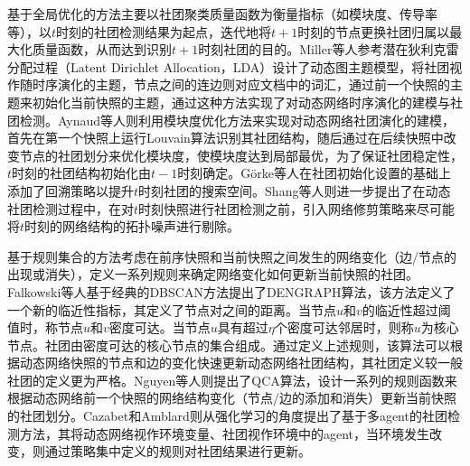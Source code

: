 基于全局优化的方法主要以社团聚类质量函数为衡量指标（如模块度、传导率等），以$t$时刻的社团检测结果为起点，迭代地将$t+1$时刻的节点更换社团归属以最大化质量函数，从而达到识别$t+1$时刻社团的目的。Miller等人\cite{miller2010continuous}参考潜在狄利克雷分配过程（Latent Dirichlet Allocation，LDA）设计了动态图主题模型，将社团视作随时序演化的主题，节点之间的连边则对应文档中的词汇，通过前一个快照的主题来初始化当前快照的主题，通过这种方法实现了对动态网络时序演化的建模与社团检测。Aynaud等人则利用模块度优化方法来实现对动态网络社团演化的建模，首先在第一个快照上运行Louvain算法识别其社团结构，随后通过在后续快照中改变节点的社团划分来优化模块度，使模块度达到局部最优，为了保证社团稳定性，$t$时刻的社团结构初始化由$t-1$时刻确定。G{\"o}rke等人\cite{gorke2010modularity}在社团初始化设置的基础上添加了回溯策略以提升$t$时刻社团的搜索空间。Shang等人\cite{shang2014real}则进一步提出了在动态社团检测过程中，在对$t$时刻快照进行社团检测之前，引入网络修剪策略来尽可能将$t$时刻的网络结构的拓扑噪声进行剔除。  

基于规则集合的方法考虑在前序快照和当前快照之间发生的网络变化（边/节点的出现或消失），定义一系列规则来确定网络变化如何更新当前快照的社团。Falkowski等人\cite{falkowski2008studying}基于经典的DBSCAN\cite{10486339}方法提出了DENGRAPH算法，该方法定义了一个新的临近性指标，其定义了节点对之间的距离。当节点$u$和$v$的临近性超过阈值时，称节点$u$和$v$密度可达。当节点$u$具有超过$\eta$个密度可达邻居时，则称$u$为核心节点。社团由密度可达的核心节点的集合组成。通过定义上述规则，该算法可以根据动态网络快照的节点和边的变化快速更新动态网络社团结构，其社团定义较一般社团的定义更为严格。Nguyen等人\cite{nguyen2011adaptive}则提出了QCA算法，设计一系列的规则函数来根据动态网络前一个快照的网络结构变化（节点/边的添加和消失）更新当前快照的社团划分。Cazabet和Amblard\cite{cazabet2011simulate}则从强化学习的角度提出了基于多agent的社团检测方法，其将动态网络视作环境变量、社团视作环境中的agent，当环境发生改变，则通过策略集中定义的规则对社团结果进行更新。


